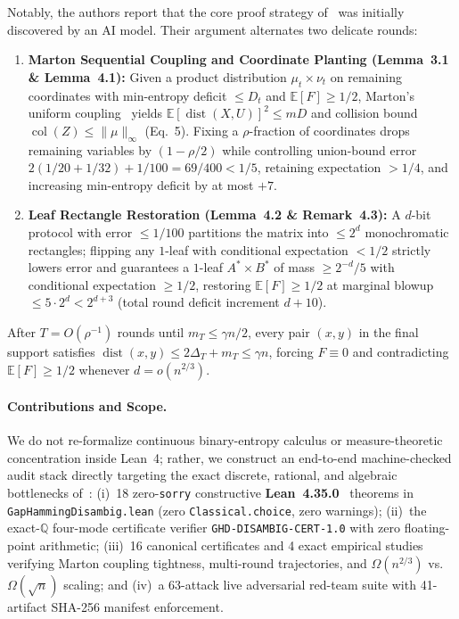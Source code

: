 \documentclass[10pt,twocolumn]{article}
\newcommand{\QQ}{\mathbb{Q}}
\newcommand{\EE}{\mathbb{E}}
\newcommand{\dist}{\operatorname{dist}}
\newcommand{\col}{\operatorname{col}}
\begin{document}
Notably, the authors report that the core proof strategy of~\cite{dahiya2026communication} was initially discovered by an AI model. Their argument alternates two delicate rounds:
\begin{enumerate}[leftmargin=*,nosep]
  \item \textbf{Marton Sequential Coupling and Coordinate Planting (Lemma~3.1 \& Lemma~4.1):} Given a product distribution $\mu_t \times \nu_t$ on remaining coordinates with min-entropy deficit $\le D_t$ and $\EE[F] \ge 1/2$, Marton's uniform coupling~\cite{marton1986simple} yields $\EE[\dist(X, U)]^2 \le m D$ and collision bound $\col(Z) \le \|\mu\|_\infty$ (Eq.~5). Fixing a $\rho$-fraction of coordinates drops remaining variables by $(1 - \rho/2)$ while controlling union-bound error $2(1/20 + 1/32) + 1/100 = 69/400 < 1/5$, retaining expectation $> 1/4$, and increasing min-entropy deficit by at most $+7$.
  \item \textbf{Leaf Rectangle Restoration (Lemma~4.2 \& Remark~4.3):} A $d$-bit protocol with error $\le 1/100$ partitions the matrix into $\le 2^d$ monochromatic rectangles; flipping any $1$-leaf with conditional expectation $< 1/2$ strictly lowers error and guarantees a $1$-leaf $A^* \times B^*$ of mass $\ge 2^{-d}/5$ with conditional expectation $\ge 1/2$, restoring $\EE[F] \ge 1/2$ at marginal blowup $\le 5 \cdot 2^d < 2^{d+3}$ (total round deficit increment $d + 10$).
\end{enumerate}
After $T = O(\rho^{-1})$ rounds until $m_T \le \gamma n/2$, every pair $(x,y)$ in the final support satisfies $\dist(x,y) \le 2\Delta_T + m_T \le \gamma n$, forcing $F \equiv 0$ and contradicting $\EE[F] \ge 1/2$ whenever $d = o(n^{2/3})$.

\paragraph{Contributions and Scope.}
We do not re-formalize continuous binary-entropy calculus or measure-theoretic concentration inside Lean~4; rather, we construct an end-to-end machine-checked audit stack directly targeting the exact discrete, rational, and algebraic bottlenecks of~\cite{dahiya2026communication}:
(i)~18 zero-\texttt{sorry} constructive \textbf{Lean~4.35.0}~\cite{demoura2021lean4} theorems in \texttt{GapHammingDisambig.lean} (zero \texttt{Classical.choice}, zero warnings);
(ii)~the exact-$\QQ$ four-mode certificate verifier \texttt{GHD-DISAMBIG-CERT-1.0} with zero floating-point arithmetic;
(iii)~16 canonical certificates and 4 exact empirical studies verifying Marton coupling tightness, multi-round trajectories, and $\Omega(n^{2/3})$ vs.\ $\Omega(\sqrt{n})$ scaling; and
(iv)~a 63-attack live adversarial red-team suite with 41-artifact SHA-256 manifest enforcement.
\end{document}
